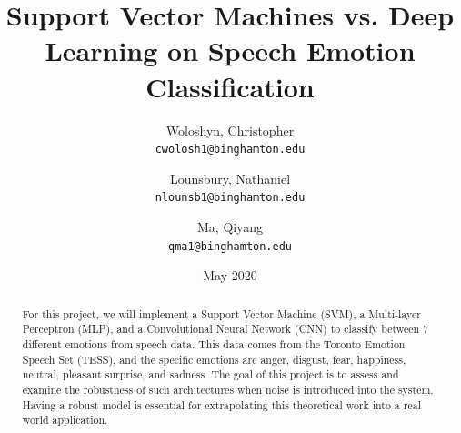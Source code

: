 \documentclass[12pt]{article}
\title{Support Vector Machines vs. Deep Learning on Speech Emotion Classification}
\author{
  Woloshyn, Christopher\\
  \texttt{cwolosh1@binghamton.edu}
  \and
  Lounsbury, Nathaniel\\
  \texttt{nlounsb1@binghamton.edu}
  \and
  Ma, Qiyang\\
  \texttt{qma1@binghamton.edu}
  }
\date{May 2020}
\begin{document}
\maketitle

\begin{abstract}
For this project, we will implement a Support Vector Machine (SVM), a Multi-layer Perceptron (MLP), and a Convolutional Neural Network (CNN) to classify between 7 different emotions from speech data. This data comes from the Toronto Emotion Speech Set (TESS), and the specific emotions are anger, disgust, fear, happiness, neutral, pleasant surprise, and sadness. The goal of this project is to assess and examine the robustness of such architectures when noise is introduced into the system. Having a robust model is essential for extrapolating this theoretical work into a real world application.
\end{abstract}
\end{document}

